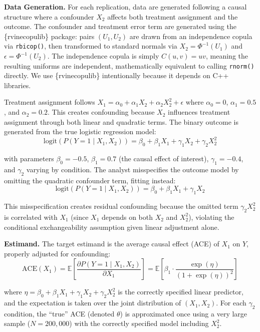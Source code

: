 \documentclass[
  man,
  longtable,
  nolmodern,
  notxfonts,
  notimes,
  colorlinks=true,linkcolor=blue,citecolor=blue,urlcolor=blue]{apa7}
\begin{document}
\textbf{Data Generation.} For each replication, data are generated
following a causal structure where a confounder \(X_2\) affects both
treatment assignment and the outcome. The confounder and treatment error
term are generated using the \{rvinecopulib\} package: pairs
\((U_1, U_2)\) are drawn from an independence copula via
\texttt{rbicop()}, then transformed to standard normals via
\(X_2 = \Phi^{-1}(U_1)\) and \(\epsilon = \Phi^{-1}(U_2)\). The
independence copula is simply \(C(u,v) = uv\), meaning the resulting
uniforms are independent, mathematically equivalent to calling
\texttt{rnorm()} directly. We use \{rvinecopulib\} intentionally because
it depends on C++ libraries.

Treatment assignment follows
\(X_1 = \alpha_0 + \alpha_1 X_2 + \alpha_2 X_2^2 + \epsilon\) where
\(\alpha_0 = 0\), \(\alpha_1 = 0.5\), and \(\alpha_2 = 0.2\). This
creates confounding because \(X_2\) influences treatment assignment
through both linear and quadratic terms. The binary outcome is generated
from the true logistic regression model: \[
\text{logit}(P(Y = 1 \mid X_1, X_2)) = \beta_0 + \beta_1 X_1 + \gamma_1 X_2 + \gamma_2 X_2^2
\]

\noindent with parameters \(\beta_0 = -0.5\), \(\beta_1 = 0.7\) (the
causal effect of interest), \(\gamma_1 = -0.4\), and \(\gamma_2\)
varying by condition. The analyst misspecifies the outcome model by
omitting the quadratic confounder term, fitting instead: \[
\text{logit}(P(Y = 1 \mid X_1, X_2)) = \beta_0 + \beta_1 X_1 + \gamma_1 X_2
\]

This misspecification creates residual confounding because the omitted
term \(\gamma_2 X_2^2\) is correlated with \(X_1\) (since \(X_1\)
depends on both \(X_2\) and \(X_2^2\)), violating the conditional
exchangeability assumption given linear adjustment alone.

\textbf{Estimand.} The target estimand is the average causal effect
(ACE) of \(X_1\) on \(Y\), properly adjusted for confounding: \[
\text{ACE}(X_1) = \mathbb{E}\left[\frac{\partial P(Y = 1 \mid X_1, X_2)}{\partial X_1}\right] = \mathbb{E}\left[\beta_1 \cdot \frac{\exp(\eta)}{(1 + \exp(\eta))^2}\right]
\]

\noindent where
\(\eta = \beta_0 + \beta_1 X_1 + \gamma_1 X_2 + \gamma_2 X_2^2\) is the
correctly specified linear predictor, and the expectation is taken over
the joint distribution of \((X_1, X_2)\). For each \(\gamma_2\)
condition, the ``true'' ACE (denoted \(\theta\)) is approximated once
using a very large sample (\(N = 200,000\)) with the correctly specified
model including \(X_2^2\).
\end{document}
